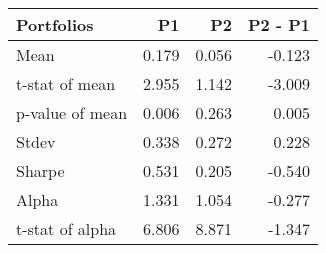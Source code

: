 \begin{tabular}{lrrr}
\toprule
Portfolios & P1 & P2 & P2 - P1 \\
\midrule
Mean & 0.179 & 0.056 & -0.123 \\
t-stat of mean & 2.955 & 1.142 & -3.009 \\
p-value of mean & 0.006 & 0.263 & 0.005 \\
Stdev & 0.338 & 0.272 & 0.228 \\
Sharpe & 0.531 & 0.205 & -0.540 \\
Alpha & 1.331 & 1.054 & -0.277 \\
t-stat of alpha & 6.806 & 8.871 & -1.347 \\
\bottomrule
\end{tabular}
